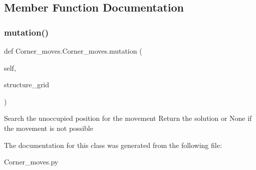 \subsection{Member Function Documentation}
\mbox{\label{classCorner__moves_1_1Corner__moves_aa6b7b51aa871e3b5c2cdc5ed14fe5706}} 
\subsubsection{\texorpdfstring{mutation()}{mutation()}}
{\footnotesize\ttfamily def Corner\+\_\+moves.\+Corner\+\_\+moves.\+mutation (\begin{DoxyParamCaption}\item[{}]{self,  }\item[{}]{structure\+\_\+grid }\end{DoxyParamCaption})}

\begin{DoxyVerb}Search the unoccupied position for the movement
    Return the solution or None if the movement is not possible
\end{DoxyVerb}
 

The documentation for this class was generated from the following file\+:\begin{DoxyCompactItemize}
\item 
Corner\+\_\+moves.\+py\end{DoxyCompactItemize}
